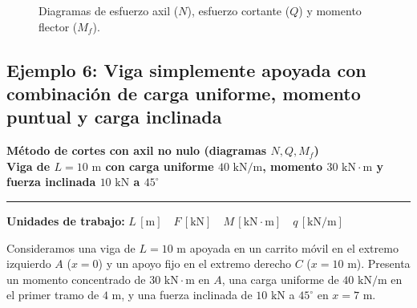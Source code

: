 \begin{figure}[H]
{%

    }

    \caption{Diagramas de esfuerzo axil ($N$), esfuerzo cortante ($Q$) y momento flector ($M_f$).}

    \label{fig:ejemplo5_diagramas}

\end{figure}





\subsection{Ejemplo 6: Viga simplemente apoyada con combinación de carga uniforme, momento puntual y carga inclinada}



\begin{tcolorbox}[colback=blue!3!white, colframe=blue!40!black, arc=3pt, boxrule=0.8pt, left=8pt, right=8pt, top=6pt, bottom=6pt]

    \centering

    {\Large\bfseries\color{blue!60!black} Método de cortes con axil no nulo (diagramas $N, Q, M_f$)}\\[2pt]

    {\normalsize\bfseries Viga de $L = 10\text{ m}$ con carga uniforme $40\text{ kN/m}$, momento $30\text{ kN}\cdot\text{m}$ y fuerza inclinada $10\text{ kN}$ a $45^\circ$}



    \vspace{4pt}\hrule\vspace{4pt}

    {\small\textbf{Unidades de trabajo:} $L\,[\text{m}] \quad F\,[\text{kN}] \quad M\,[\text{kN}\cdot\text{m}] \quad q\,[\text{kN/m}]$}

\end{tcolorbox}






Consideramos una viga de $L = 10\text{ m}$ apoyada en un carrito móvil en el extremo izquierdo $A$ ($x=0$) y un apoyo fijo en el extremo derecho $C$ ($x=10\text{ m}$). Presenta un momento concentrado de $30\text{ kN}\cdot\text{m}$ en $A$, una carga uniforme de $40\text{ kN/m}$ en el primer tramo de $4\text{ m}$, y una fuerza inclinada de $10\text{ kN}$ a $45^\circ$ en $x = 7\text{ m}$.



